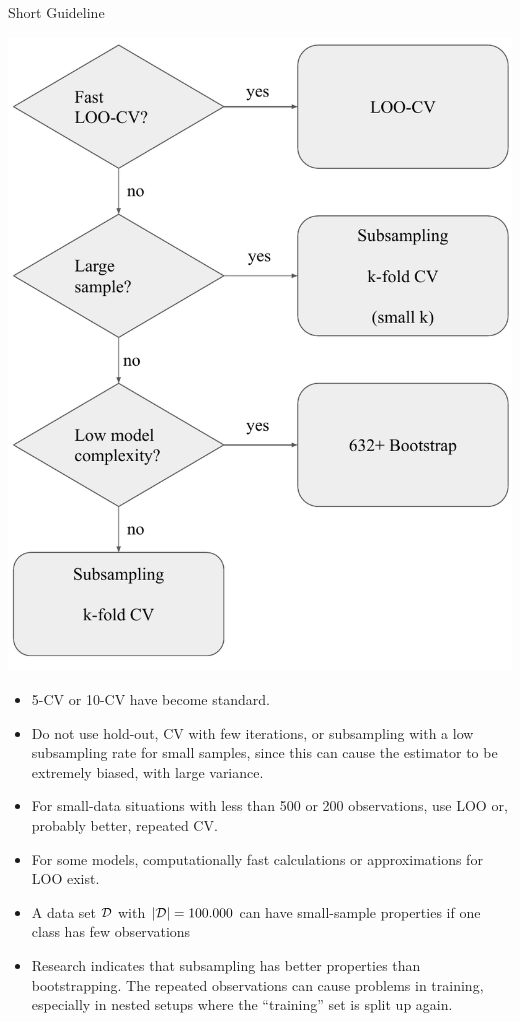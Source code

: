 \begin{vbframe}{Short Guideline}

\fboxsep=0pt
\noindent%
\begin{minipage}[t]{0.42\linewidth}
\vspace{0pt}
\includegraphics{figure_man/resampling_dec_tree}
\end{minipage}%
\hfill%
%
\begin{minipage}[t]{0.58\linewidth}
\vspace{0pt}
\scriptsize
\begin{itemize}
  \item 5-CV or 10-CV have become standard.
  \item Do not use hold-out, CV with few iterations, or subsampling with a low 
  subsampling rate for small samples, since this can cause the estimator to be 
  extremely biased, with large variance.
  \item For small-data situations with less than 500 or 200 observations, use 
  LOO or, probably better, repeated CV.
  \item For some models, computationally fast calculations or approximations 
  for LOO exist.
  \item A data set $\mathcal{D}$ with $|\mathcal{D}| = 100.000$ can have small-sample properties 
  if one class has few observations 
  \item Research indicates that subsampling has better properties than
    bootstrapping. The repeated observations can cause problems in training,
    especially in nested setups where the \enquote{training} set is split up again.
\end{itemize}
\end{minipage}



\end{vbframe}

\endlecture

